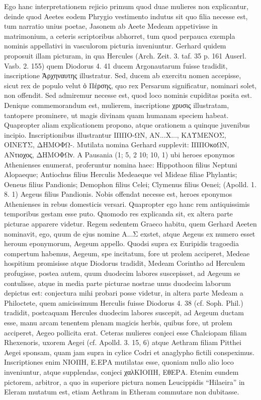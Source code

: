\documentclass[a4paper, 11pt, oneside, polutonikogreek, german]{article}
\begin{document}
Ego hanc interpretationem rejicio primum quod duae mulieres non explicantur, deinde quod Aeetes eodem Phrygio vestimento indutus sit quo filia necesse est, tum narratio unius poetae, Jasonem ab Aeete Medeam appetivisse in matrimonium, a ceteris scriptoribus abhorret, tum quod perpauca exempla nominis appellativi in vasculorom picturia inveniuntur. Gerhard quidem proposuit illam picturam, in qua Hercules (Arch. Zeit. 3. taf. 35 p. 161 Auserl. Vasb. 2. 155) quem Diodorus 4. 41 ducem Argonautarum fuisse tradidit, inscriptione Ἀρχηναυτης illustratur. Sed, ducem ab exercitu nomen accepisse, sicut rex de populo velut ὁ Πέρσης, quo rex Persarum significatur, nominari solet, non offendit. Sed admiremur necesse est, quod loco nominis cupiditas posita est. Denique commemorandum est, mulierem, inscriptione χρυσις illustratam, tantopere prominere, ut magis divinam quam humanam speciem habeat. Quapropter aliam explicationem propono, atque orationem a quinque juvenibus incipio. Inscriptionibus illustrantur ΙΠΠΟ-ΩΝ, ΑΝ...Χ..., ΚΛΥΜΕΝΟΣ, ΟΙΝΕΥΣ, ΔΗΜΟΦΩ-. Mutilata nomina Gerhard supplevit: ΙΠΠΟκοΩΝ, ΑΝτιοχος, ΔΗΜΟΦΩν. A Pausania (1; 5, 2 10; 10, 1) ubi heroes eponymos Athenienses enumerat, proferuntur nomina haec: Hippothoon filius Neptuni Alopaeque; Antiochus filius Herculis Medeaeque vel Mideae filiae Phylantis; Oeneus filius Pandionis; Demophon filius Celei; Clymenus filius Oenei; (Apolld. 1. 8. 1) Aegeus filius Pandionis. Nobis offendat necesse est, heroes eponymos Athenienses in rebus domesticis versari. Quapropter ego hanc rem antiquissimis temporibus gestam esse puto. Quomodo res explicanda sit, ex altera parte picturae apparere videtur. Regem sedentem Graeco habitu, quem Gerhard Aeeten nominavit, ego, quum de ejus nomine Α...Σ exstet, atque Aegeus ex numero esset heroum eponymorum, Aegeum appello. Quodsi supra ex Euripidis tragoedia compertum habemus, Aegeum, spe incitatum, fore ut prolem acciperet, Medeae hospitium promisisse atque Diodorus tradidit, Medeam Corintho ad Herculem profugisse, postea autem, quum duodecim labores suscepisset, ad Aegeum se contulisse, atque in media parte picturae nostrae unus duodecim laborum depictus est: conjectura mihi probari posse videtur, in altera parte Medeam a Philoctete, quem amicissimum Herculis fuisse Diodorus 4. 38 (cf. Soph. Phil.) tradidit, postcaquam Hercules duodecim labores suscepit, ad Aegeum ductam esse, manu arcam tenentem plenam magicis herbis, quibus fore, ut prolem acciperet, Aegeo pollicita erat. Ceteras mulieres conjeci esse Chalciopam filiam Rhexenoris, uxorem Aegei (cf. Apolld. 3. 15, 6) atque Aethram filiam Pitthei Aegei sponsam, quam jam supra in cylice Codri et anaglypho fictili conspeximus. Inscriptiones enim ΝΙΟΠΗ, Ε.ΕΡΑ mutilatas esse, quoniam nullo alio loco inveniuntur, atque supplendas, conjeci χαλΚΙΟΠΗ, ΕθΕΡΑ. Etenim eundem pictorem, arbitror, a quo in superiore pictura nomen Leucippidis "`Hilaeira"' in Eleram mutatum est, etiam Aethram in Etheram commutare non dubitasse.
\end{document}
